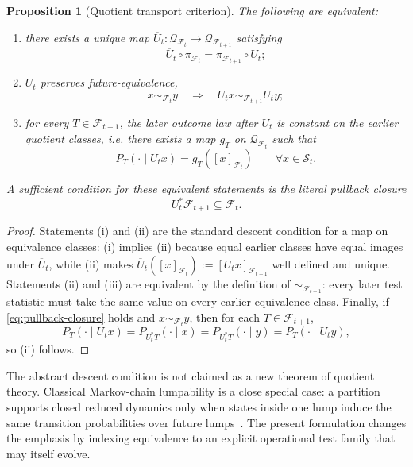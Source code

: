 \documentclass[11pt]{article}
\newtheorem{proposition}[definition]{Proposition}
\newcommand{\F}{\mathcal F}
\newcommand{\Sspace}{\mathcal S}
\newcommand{\Q}{\mathcal Q}
\begin{document}
\begin{proposition}[Quotient transport criterion]
\label{prop:quotient-transport}
The following are equivalent:
\begin{enumerate}[label=(\roman*)]
\item there exists a unique map $\overline U_t:\Q_{\F_t}\to\Q_{\F_{t+1}}$ satisfying
\begin{equation}
  \overline U_t\circ\pi_{\F_t}
  =
  \pi_{\F_{t+1}}\circ U_t;
  \label{eq:quotient-commute}
\end{equation}
\item $U_t$ preserves future-equivalence,
\begin{equation}
  x\sim_{\F_t}y
  \quad\Longrightarrow\quad
  U_t x\sim_{\F_{t+1}}U_t y;
  \label{eq:equiv-preservation}
\end{equation}
\item for every $T\in\F_{t+1}$, the later outcome law after $U_t$ is constant on the earlier quotient classes, i.e. there exists a map $g_T$ on $\Q_{\F_t}$ such that
\begin{equation}
  P_T(\cdot\mid U_t x)=g_T([x]_{\F_t})
  \qquad\forall x\in\Sspace_t.
  \label{eq:test-factorization}
\end{equation}
\end{enumerate}
A sufficient condition for these equivalent statements is the literal pullback closure
\begin{equation}
  U_t^{\ast}\F_{t+1}\subseteq\F_t.
  \label{eq:pullback-closure}
\end{equation}
\end{proposition}

\begin{proof}
Statements (i) and (ii) are the standard descent condition for a map on equivalence classes: (i) implies (ii) because equal earlier classes have equal images under $\overline U_t$, while (ii) makes $\overline U_t([x]_{\F_t}):=[U_t x]_{\F_{t+1}}$ well defined and unique. Statements (ii) and (iii) are equivalent by the definition of $\sim_{\F_{t+1}}$: every later test statistic must take the same value on every earlier equivalence class. Finally, if \eqref{eq:pullback-closure} holds and $x\sim_{\F_t}y$, then for each $T\in\F_{t+1}$,
\[
P_T(\cdot\mid U_t x)
=P_{U_t^{\ast}T}(\cdot\mid x)
=P_{U_t^{\ast}T}(\cdot\mid y)
=P_T(\cdot\mid U_t y),
\]
so (ii) follows.
\end{proof}

The abstract descent condition is not claimed as a new theorem of quotient theory. Classical Markov-chain lumpability is a close special case: a partition supports closed reduced dynamics only when states inside one lump induce the same transition probabilities over future lumps~\cite{jernigan2003}. The present formulation changes the emphasis by indexing equivalence to an explicit operational test family that may itself evolve.
\end{document}
